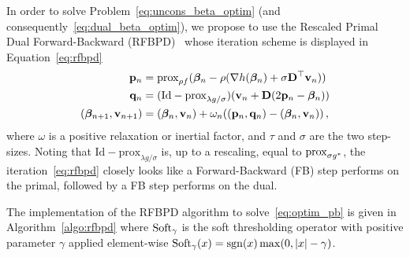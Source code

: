 In order to solve Problem~\eqref{eq:uncons_beta_optim} (and
consequently~\eqref{eq:dual_beta_optim}), we propose to use the Rescaled Primal
Dual Forward-Backward (RFBPD)~\cite{Komodakis_N_2015_j-ieee-sig-proc-mag_playing_d}
whose iteration scheme is displayed in Equation~\eqref{eq:rfbpd}
\begin{equation}
  \label{eq:rfbpd}
  \begin{aligned}
    \*p_{n} &= \textrm{prox}_{\rho f} (\bbeta_{n}-\rho(\nabla h(\bbeta_{n})+\sigma \*D^{\top}\*v_{n})) \\
    \*q_{n} &= (\mathrm{Id}-\textrm{prox}_{\lambda g/\sigma}) (\*v_{n}+\*D(2\*p_{n}-\bbeta_{n})) \\
    (\*\bbeta_{n+1},\*v_{n+1}) &= (\bbeta_{n},\*v_{n}) + \omega_{n}((\*p_{n},\*q_{n})-(\bbeta_{n},\*v_{n}))
    \, ,
  \end{aligned}
\end{equation}
where $\omega$ is a positive relaxation or inertial factor, and $\tau$ and $\sigma$ are the
two step-sizes.
Noting that $\mathrm{Id}-\textrm{prox}_{\lambda g/\sigma}$ is, up to a rescaling, equal to
$\operatorname{prox}_{\sigma g^{*}}$, the iteration~\eqref{eq:rfbpd} closely looks like a
Forward-Backward (FB) step performs on the primal, followed by a FB step
performs on the dual.

The implementation of the RFBPD algorithm to solve~\eqref{eq:optim_pb} is given
in Algorithm~\ref{algo:rfbpd} where $\operatorname{Soft}_{\gamma}$ is the soft thresholding operator
with positive parameter $\gamma$ applied element-wise
$\operatorname{Soft}_{\gamma}(x) = \operatorname{sgn}(x)\max(0,\left\lvert x\right\rvert-\gamma)$.

